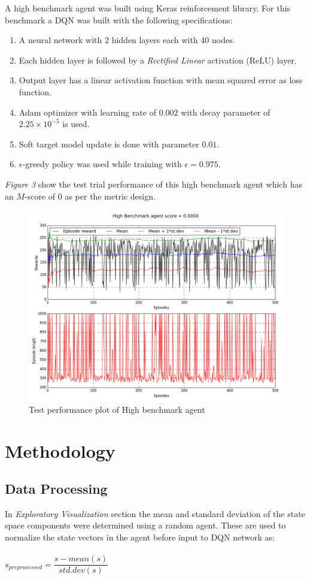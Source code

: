 \documentclass{article}
\begin{document}
A high benchmark agent was built using Keras reinforcement library\cite{kerasrl}. For this benchmark a DQN was built with the following specifications:
\vspace{-0.1cm}
\begin{enumerate}
	\item A neural network with 2 hidden layers each with 40 nodes.
	\item Each hidden layer is followed by a \textit{Rectified Linear} activation (ReLU) layer.
	\item Output layer has a linear activation function with mean squared error as loss function.
	\item Adam optimizer with learning rate of $0.002$ with decay parameter of $2.25\times10^{-5}$ is used.
	\item Soft target model update is done with parameter $0.01$.
	\item $\epsilon$-greedy policy was used while training with $\epsilon = 0.975$.
\end{enumerate}
\textit{Figure 3} show the test trial performance of this high benchmark agent which has an $M$-score of $0$ as per the metric design.
\begin{figure}[H]
	\caption{Test performance plot of High benchmark agent}
	\centering
	\includegraphics[width=13cm,trim={0 0 0 0},clip]{img/highbenchmark_test_evaluation}
\end{figure}	
\section{Methodology}
\subsection*{Data Processing}
In \textit{Exploratory Visualization} section the mean and standard deviation of the state space components were determined using a random agent. These are used to normalize the state vectors in the agent before input to DQN network as:\\\\
$s_{preprocessed} = \dfrac{s - mean(s)}{std.dev(s)}$
\end{document}
